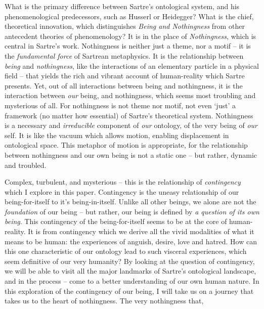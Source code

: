 
What is the primary difference between Sartre's ontological system, and his phenomenological predecessors, such as Husserl or Heidegger? What is the chief, theoretical innovation, which distinguishes \emph{Being and Nothingness} from other antecedent theories of phenomenology? It is in the place of \emph{Nothingness}, which is central in Sartre's work. Nothingness is neither just a theme, nor a motif -- it is the \emph{fundamental force} of Sartrean metaphysics. It is the relationship between \emph{being} and \emph{nothingness}, like the interactions of an elementary particle in a physical field -- that yields the rich and vibrant account of human-reality which Sartre presents. Yet, out of all interactions between being and nothingness, it is the interaction between \emph{our} being, and nothingness, which seems most troubling and mysterious of all. For nothingness is not theme nor motif, not even \enquote*{just} a framework (no matter how essential) of Sartre's theoretical system. Nothingness is a necessary and \emph{irreducible} component of \emph{our} ontology, of the very being of \emph{our} self. It is like the vacuum which allows motion, enabling displacement in ontological space. This metaphor of motion is appropriate, for the relationship between nothingness and our own being is not a static one -- but rather, dynamic and troubled.

Complex, turbulent, and mysterious -- this is the relationship of \emph{contingency} which I explore in this paper. Contingency is the uneasy relationship of our being-for-itself to it's being-in-itself. Unlike all other beings, we alone are not the \emph{foundation} of our being -- but rather, our being is defined by \emph{a question of its own being}. This contingency of the being-for-itself seems to be at the core of human-reality. It is from contingency which we derive all the vivid modalities of what it means to be human: the experiences of anguish, desire, love and hatred. How can this one characteristic of our ontology lead to such visceral experiences, which seem definitive of our very humanity? By looking at the question of contingency, we will be able to visit all the major landmarks of Sartre's ontological landscape, and in the process -- come to a better understanding of our own human nature. In this exploration of the contingency of our being, I will take us on a journey that takes us to the heart of nothingness. The very nothingness that, 